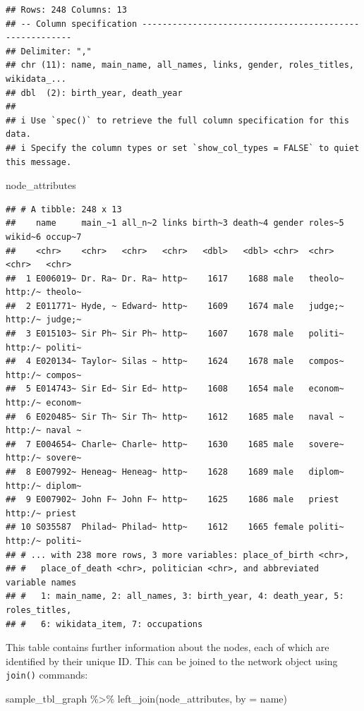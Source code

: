 \documentclass[
]{book}
\newenvironment{Shaded}{\begin{snugshade}}{\end{snugshade}}
\newcommand{\AttributeTok}[1]{\textcolor[rgb]{0.77,0.63,0.00}{#1}}
\newcommand{\FunctionTok}[1]{\textcolor[rgb]{0.00,0.00,0.00}{#1}}
\newcommand{\NormalTok}[1]{#1}
\newcommand{\SpecialCharTok}[1]{\textcolor[rgb]{0.00,0.00,0.00}{#1}}
\newcommand{\StringTok}[1]{\textcolor[rgb]{0.31,0.60,0.02}{#1}}
\begin{document}
\begin{verbatim}
## Rows: 248 Columns: 13
## -- Column specification --------------------------------------------------------
## Delimiter: ","
## chr (11): name, main_name, all_names, links, gender, roles_titles, wikidata_...
## dbl  (2): birth_year, death_year
## 
## i Use `spec()` to retrieve the full column specification for this data.
## i Specify the column types or set `show_col_types = FALSE` to quiet this message.
\end{verbatim}

\begin{Shaded}
\begin{Highlighting}[]
\NormalTok{node\_attributes}
\end{Highlighting}
\end{Shaded}

\begin{verbatim}
## # A tibble: 248 x 13
##    name     main_~1 all_n~2 links birth~3 death~4 gender roles~5 wikid~6 occup~7
##    <chr>    <chr>   <chr>   <chr>   <dbl>   <dbl> <chr>  <chr>   <chr>   <chr>  
##  1 E006019~ Dr. Ra~ Dr. Ra~ http~    1617    1688 male   theolo~ http:/~ theolo~
##  2 E011771~ Hyde, ~ Edward~ http~    1609    1674 male   judge;~ http:/~ judge;~
##  3 E015103~ Sir Ph~ Sir Ph~ http~    1607    1678 male   politi~ http:/~ politi~
##  4 E020134~ Taylor~ Silas ~ http~    1624    1678 male   compos~ http:/~ compos~
##  5 E014743~ Sir Ed~ Sir Ed~ http~    1608    1654 male   econom~ http:/~ econom~
##  6 E020485~ Sir Th~ Sir Th~ http~    1612    1685 male   naval ~ http:/~ naval ~
##  7 E004654~ Charle~ Charle~ http~    1630    1685 male   sovere~ http:/~ sovere~
##  8 E007992~ Heneag~ Heneag~ http~    1628    1689 male   diplom~ http:/~ diplom~
##  9 E007902~ John F~ John F~ http~    1625    1686 male   priest  http:/~ priest 
## 10 S035587  Philad~ Philad~ http~    1612    1665 female politi~ http:/~ politi~
## # ... with 238 more rows, 3 more variables: place_of_birth <chr>,
## #   place_of_death <chr>, politician <chr>, and abbreviated variable names
## #   1: main_name, 2: all_names, 3: birth_year, 4: death_year, 5: roles_titles,
## #   6: wikidata_item, 7: occupations
\end{verbatim}

This table contains further information about the nodes, each of which are identified by their unique ID. This can be joined to the network object using \texttt{join()} commands:

\begin{Shaded}
\begin{Highlighting}[]
\NormalTok{sample\_tbl\_graph }\SpecialCharTok{\%\textgreater{}\%} 
  \FunctionTok{left\_join}\NormalTok{(node\_attributes, }\AttributeTok{by =} \StringTok{\textquotesingle{}name\textquotesingle{}}\NormalTok{)}
\end{Highlighting}
\end{Shaded}
\end{document}
